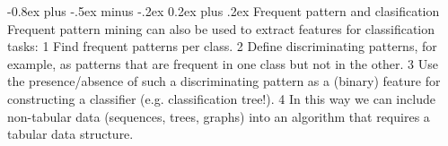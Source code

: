 \documentclass[8pt,landscape]{extarticle}
\makeatletter
\renewcommand{\subsection}{\@startsection{subsection}{2}{0mm}%
                                {-0.8ex plus -.5ex minus -.2ex}%
                                {0.2ex plus .2ex}%
                                {\normalfont\normalsize\bfseries}}
\makeatother
\begin{document}
\begin{multicols}{3}
\subsection{Frequent pattern and clasification}
Frequent pattern mining can also be used to extract features for classification
tasks: 1 Find frequent patterns per class.
2 Define discriminating patterns, for example,
as patterns that are frequent in one class but not in the other.
3 Use the presence/absence of such a discriminating pattern as a (binary)
feature for constructing a classifier (e.g. classification tree!).
4 In this way we can include non-tabular data (sequences, trees, graphs)
into an algorithm that requires a tabular data structure.
\end{multicols}
\end{document}

